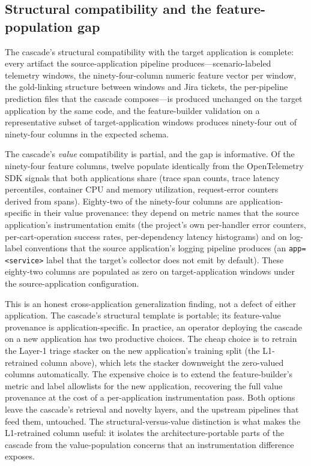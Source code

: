 \subsection{Structural compatibility and the feature-population gap}
\label{sec:cross-app:feature-gap}

The cascade's structural compatibility with the target application is complete: every artifact the source-application pipeline produces---scenario-labeled telemetry windows, the ninety-four-column numeric feature vector per window, the gold-linking structure between windows and Jira tickets, the per-pipeline prediction files that the cascade composes---is produced unchanged on the target application by the same code, and the feature-builder validation on a representative subset of target-application windows produces ninety-four out of ninety-four columns in the expected schema.

The cascade's \emph{value} compatibility is partial, and the gap is informative. Of the ninety-four feature columns, twelve populate identically from the OpenTelemetry SDK signals that both applications share (trace span counts, trace latency percentiles, container CPU and memory utilization, request-error counters derived from spans). Eighty-two of the ninety-four columns are application-specific in their value provenance: they depend on metric names that the source application's instrumentation emits (the project's own per-handler error counters, per-cart-operation success rates, per-dependency latency histograms) and on log-label conventions that the source application's logging pipeline produces (an \texttt{app=<service>} label that the target's collector does not emit by default). These eighty-two columns are populated as zero on target-application windows under the source-application configuration.

This is an honest cross-application generalization finding, not a defect of either application. The cascade's structural template is portable; its feature-value provenance is application-specific. In practice, an operator deploying the cascade on a new application has two productive choices. The cheap choice is to retrain the Layer-1 triage stacker on the new application's training split (the L1-retrained column above), which lets the stacker downweight the zero-valued columns automatically. The expensive choice is to extend the feature-builder's metric and label allowlists for the new application, recovering the full value provenance at the cost of a per-application instrumentation pass. Both options leave the cascade's retrieval and novelty layers, and the upstream pipelines that feed them, untouched. The structural-versus-value distinction is what makes the L1-retrained column useful: it isolates the architecture-portable parts of the cascade from the value-population concerns that an instrumentation difference exposes.
